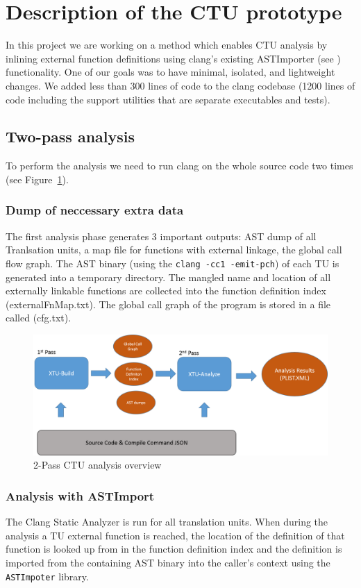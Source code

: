 \documentclass{article}
\begin{document}
\section{Description of the CTU prototype}
In this project we are working on a method which enables CTU analysis 
by inlining external function definitions using clang's existing ASTImporter 
(see \cite{astimporter}) functionality.
One of our goals was to have minimal, isolated, and lightweight changes.
We added less than 300 lines of code to the clang codebase 
(1200 lines of code including the support utilities that are 
  separate executables and tests). 

\subsection{Two-pass analysis}
To perform the analysis we need to run clang on the whole source code two times 
(see Figure~\ref{figctu}).

\subsubsection{Dump of neccessary extra data}
The first analysis phase generates 3 important outputs: AST dump of all
Tranlsation units, a map file for functions with external linkage, the global call flow graph.
The AST binary (using the {\tt clang -cc1 -emit-pch}) 
of each TU is generated into a temporary directory. 
The mangled name and location of all externally linkable functions 
are collected into the function definition index (externalFnMap.txt). 
The global call graph of the program is stored in a file called (cfg.txt).


\begin{figure}[h!]
\includegraphics[width=\textwidth]{images/ctu.png}
\caption{2-Pass CTU analysis overview}
\label{figctu}
\end{figure}

\subsubsection{Analysis with ASTImport}
The Clang Static Analyzer is run for all translation units. When during the
analysis a TU external function is reached, the location of the definition 
of that function is looked up from in the function definition index and the 
definition is imported from the containing AST binary into the caller's context
using the \texttt{ASTImpoter} library.
\end{document}
